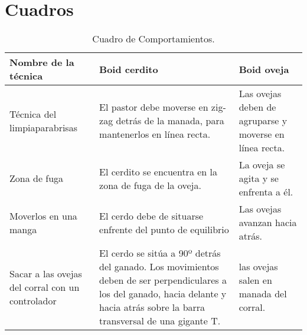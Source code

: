 \section{Cuadros}
\label{sec:cuadros}

\begin{table}[h]
\caption{Cuadro de Comportamientos.}
\centering
\begin{tabular}{| p{4cm} | p{7cm} | p{4cm} |} %

\hline\hline %
Nombre de la técnica & Boid cerdito & Boid oveja \\ [0.5ex] %
\hline %
Técnica del limpiaparabrisas & El pastor debe moverse en zig-zag detrás de la manada, para mantenerlos en línea recta. & Las ovejas deben de agruparse y moverse en línea recta.\\

Zona de fuga & El cerdito se encuentra en la zona de fuga de la oveja. & La oveja se agita y se enfrenta a él. \\

Moverlos en una manga & El cerdo debe de situarse enfrente del punto de equilibrio & Las ovejas avanzan hacia atrás. \\

Sacar a las ovejas del corral con un controlador & El cerdo se sitúa  a 90º detrás del ganado. Los movimientos deben de ser perpendiculares a los del ganado, hacia delante y 
hacia atrás sobre la barra transversal de una gigante T. & las ovejas salen en manada del corral. \\ [1ex] %
\hline %
\end{tabular}
\label{table:nonlin} %
\end{table}